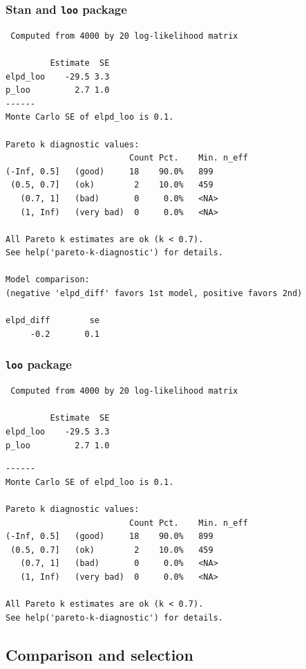 \documentclass[10pt]{beamer}
\begin{document}
\begin{frame}[fragile]

\frametitle{Stan and {\tt loo} package}

  {\scriptsize
\begin{lstlisting}
 Computed from 4000 by 20 log-likelihood matrix

         Estimate  SE
elpd_loo    -29.5 3.3
p_loo         2.7 1.0
------
Monte Carlo SE of elpd_loo is 0.1.

Pareto k diagnostic values:
                         Count Pct.    Min. n_eff
(-Inf, 0.5]   (good)     18    90.0%   899
 (0.5, 0.7]   (ok)        2    10.0%   459
   (0.7, 1]   (bad)       0     0.0%   <NA>
   (1, Inf)   (very bad)  0     0.0%   <NA>

All Pareto k estimates are ok (k < 0.7).
See help('pareto-k-diagnostic') for details.

Model comparison:
(negative 'elpd_diff' favors 1st model, positive favors 2nd)

elpd_diff        se
     -0.2       0.1
\end{lstlisting}
}

\end{frame}


\begin{frame}[fragile]
\frametitle{{\tt loo} package}

  {\scriptsize
\begin{lstlisting}
 Computed from 4000 by 20 log-likelihood matrix

         Estimate  SE
elpd_loo    -29.5 3.3
p_loo         2.7 1.0
\end{lstlisting}
      {\color{gray}
\begin{lstlisting}
------
Monte Carlo SE of elpd_loo is 0.1.

Pareto k diagnostic values:
                         Count Pct.    Min. n_eff
(-Inf, 0.5]   (good)     18    90.0%   899
 (0.5, 0.7]   (ok)        2    10.0%   459
   (0.7, 1]   (bad)       0     0.0%   <NA>
   (1, Inf)   (very bad)  0     0.0%   <NA>

All Pareto k estimates are ok (k < 0.7).
See help('pareto-k-diagnostic') for details.
\end{lstlisting}}
}
\end{frame}

\subsection{Comparison and selection}
\end{document}
